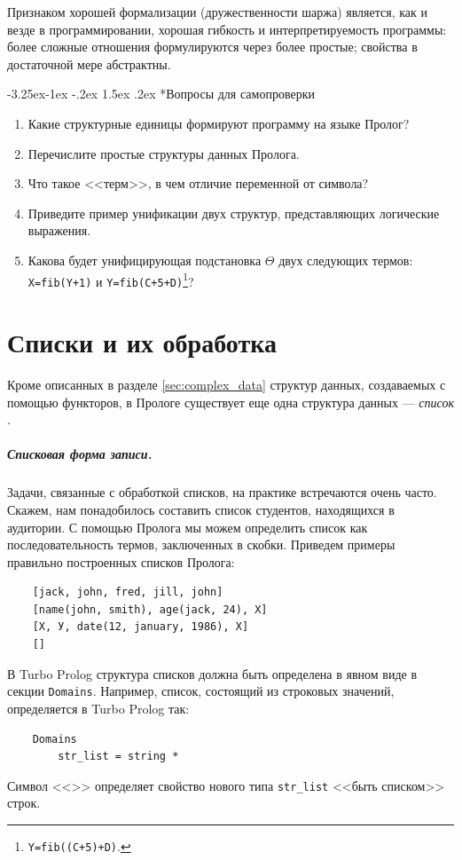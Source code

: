 \documentclass[12pt, openany, twoside]{book} %
\makeatletter
\renewcommand\subsubsection{\@startsection{subsubsection}{3}{\z@}%
                                     {-3.25ex\@plus -1ex \@minus -.2ex}%
                                     {1.5ex \@plus .2ex}%
                                     {\normalfont\normalsize\bfseries}}
\newenvironment{questions}{\subsubsection*{Вопросы для самопроверки}\begin{enumerate}}{\end{enumerate}}
\makeatother
\begin{document}
Признаком хорошей формализации (дружественности шаржа) является, как и везде в программировании, хорошая гибкость и интерпретируемость программы: более сложные отношения формулируются через более простые; свойства в достаточной мере абстрактны.

\begin{questions}
\item{} Какие структурные единицы формируют программу на языке Пролог?
\item{} Перечислите простые структуры данных Пролога.
\item{} Что такое <<терм>>, в чем отличие переменной от символа?
\item{} Приведите пример унификации двух структур, представляющих логические выражения.
\item{} Какова будет унифицирующая подстановка $\Theta$ двух следующих термов: \texttt{X=fib(Y+1)} и \texttt{Y=fib(C+5+D)}\footnote{\texttt{Y=fib((C+5)+D)}.}?
\end{questions}

\chapter{Списки и их обработка}

Кроме описанных в разделе \ref{sec:complex_data} структур данных, создаваемых с помощью функторов, в Прологе существует еще одна структура данных --- {\em список} \cite{Bratko}.

\paragraph{Списковая форма записи.} Задачи, связанные с обработкой списков, на практике встречаются очень часто. Скажем, нам понадобилось составить список студентов, находящихся в аудитории. С помощью Пролога мы можем определить список как последовательность термов, заключенных в скобки. Приведем примеры правильно построенных списков Пролога:

{\tt\begin{verbatim}
    [jack, john, fred, jill, john]
    [name(john, smith), age(jack, 24), X]
    [Х, У, date(12, january, 1986), Х]
    []
\end{verbatim}}
\noindent В Turbo Prolog структура списков должна быть определена в явном виде в секции {\tt Domains}. Например, список, состоящий из строковых значений, определяется в Turbo Prolog так:
{\tt\begin{verbatim}
    Domains
        str_list = string *
\end{verbatim}}
\noindent Символ <<{\tt *}>> определяет свойство нового типа {\tt str\_list} <<быть списком>> строк.
\end{document}
